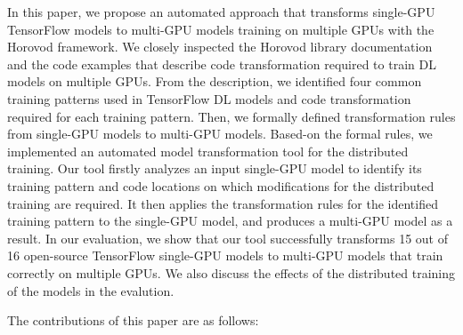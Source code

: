 In this paper, we propose an automated approach that transforms single-GPU
TensorFlow models to multi-GPU models training on multiple GPUs with the
Horovod framework.
We closely inspected the Horovod library documentation and the code examples
that describe code transformation required to train DL models on multiple GPUs.
From the description, we identified four common training patterns used in
TensorFlow DL models and code transformation required for each training
pattern.
Then, we formally defined transformation rules from single-GPU models to
multi-GPU models.
Based-on the formal rules, we implemented an automated model transformation
tool for the distributed training.
Our tool firstly analyzes an input single-GPU model to identify its training
pattern and code locations on which modifications for the distributed training
are required.
It then applies the transformation rules for the identified training pattern to
the single-GPU model, and produces a multi-GPU model as a result.
In our evaluation, we show that our tool successfully transforms 15 out of 16
open-source TensorFlow single-GPU models to multi-GPU models that train
correctly on multiple GPUs.
We also discuss the effects of the distributed training of the models in the
evalution.



The contributions of this paper are as follows:

